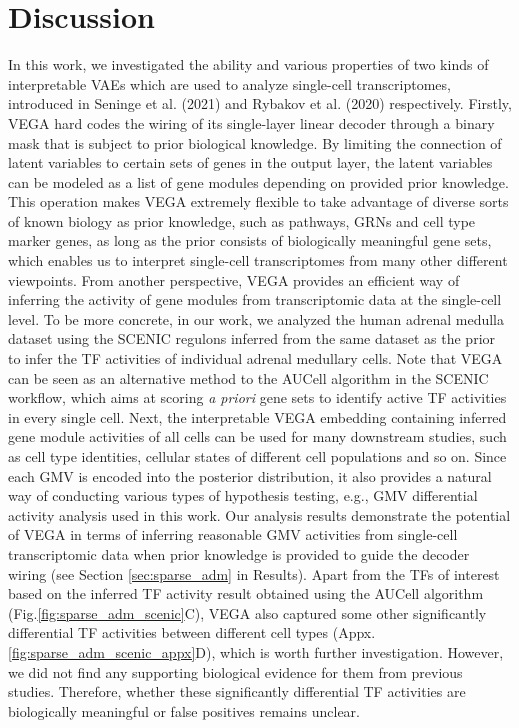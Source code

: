 \chapter{Discussion}
In this work, we investigated the ability and various properties of two kinds of interpretable VAEs which are used to analyze single-cell transcriptomes, introduced in Seninge et al. (2021) and Rybakov et al. (2020) respectively. Firstly, VEGA\cite{Seninge2021} hard codes the wiring of its single-layer linear decoder through a binary mask that is subject to prior biological knowledge. By limiting the connection of latent variables to certain sets of genes in the output layer, the latent variables can be modeled as a list of gene modules depending on provided prior knowledge. This operation makes VEGA extremely flexible to take advantage of diverse sorts of known biology as prior knowledge, such as pathways, GRNs and cell type marker genes, as long as the prior consists of biologically meaningful gene sets, which enables us to interpret single-cell transcriptomes from many other different viewpoints. From another perspective, VEGA provides an efficient way of inferring the activity of gene modules from transcriptomic data at the single-cell level. To be more concrete, in our work, we analyzed the human adrenal medulla dataset\cite{Jansky2021} using the SCENIC regulons\cite{Jansky2021} inferred from the same dataset as the prior to infer the TF activities of individual adrenal medullary cells. Note that VEGA can be seen as an alternative method to the AUCell algorithm in the SCENIC workflow\cite{Aibar2017}, which aims at scoring \textit{a priori} gene sets to identify active TF activities in every single cell. Next, the interpretable VEGA embedding containing inferred gene module activities of all cells can be used for many downstream studies, such as cell type identities, cellular states of different cell populations and so on. Since each GMV is encoded into the posterior distribution, it also provides a natural way of conducting various types of hypothesis testing, e.g., GMV differential activity analysis\cite{Seninge2021} used in this work. Our analysis results demonstrate the potential of VEGA in terms of inferring reasonable GMV activities from single-cell transcriptomic data when prior knowledge is provided to guide the decoder wiring (see Section \ref{sec:sparse_adm} in Results). Apart from the TFs of interest based on the inferred TF activity result obtained using the AUCell algorithm (Fig.\ref{fig:sparse_adm_scenic}C), VEGA also captured some other significantly differential TF activities between different cell types (Appx.\ref{fig:sparse_adm_scenic_appx}D), which is worth further investigation. However, we did not find any supporting biological evidence for them from previous studies. Therefore, whether these significantly differential TF activities are biologically meaningful or false positives remains unclear.

